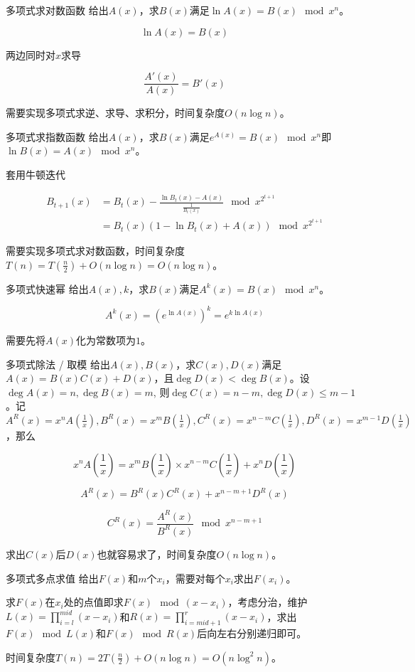 \documentclass{beamer}
\begin{document}
	\begin{frame}{多项式求对数函数}
		给出$A(x)$，求$B(x)$满足$\ln A(x)=B(x) \mod x^n$。
		
		$$\ln A(x)=B(x)$$
		
		两边同时对$x$求导
		
		$$\frac{A'(x)}{A(x)}=B'(x)$$
		
		需要实现多项式求逆、求导、求积分，时间复杂度$O(n\log n)$。
		
		
	\end{frame}
	\begin{frame}{多项式求指数函数}
		给出$A(x)$，求$B(x)$满足$e^{A(x)}=B(x) \mod x^n$即$\ln B(x) = A(x) \mod x^n$。 
		
		套用牛顿迭代
		
		$$\begin{aligned}B_{t+1}(x)&=B_t(x)-\frac{\ln B_t(x)-A(x)}{\frac{1}{B_t(x)}} \mod x^{2^{t+1}}\\&=B_t(x)(1-\ln B_t(x)+A(x))\mod x^{2^{t+1}}\end{aligned}$$ 
		
		需要实现多项式求对数函数，时间复杂度$T(n)=T(\frac n2)+O(n\log n)=O(n\log n)$。
	\end{frame}
	\begin{frame}{多项式快速幂}
		给出$A(x),k$，求$B(x)$满足$A^k(x)=B(x) \mod x^n$。
		
		$$A^k(x)=(e^{\ln A(x)})^k=e^{k\ln A(x)}$$
		
		需要先将$A(x)$化为常数项为$1$。
	\end{frame}
	\begin{frame}{多项式除法 / 取模}
		给出$A(x),B(x)$，求$C(x),D(x)$满足$A(x)=B(x)C(x)+D(x)$，且$\deg D(x) < \deg B(x)$。设$\deg A(x) = n, \deg B(x) = m$, 则$\deg C(x) = n-m, \deg D(x) \le m-1$。记$A^R(x)=x^nA(\frac 1x),B^R(x)=x^mB(\frac 1x),C^R(x)=x^{n-m}C(\frac 1x), D^R(x)=x^{m-1}D(\frac{1}{x})$，那么
		
		$$x^nA(\frac 1x)=x^mB(\frac 1x)\times x^{n-m}C(\frac 1x) + x^nD(\frac1x)$$
		
		$$A^R(x)=B^R(x)C^R(x)+x^{n-m+1}D^R(x)$$
		
		$$C^R(x)=\frac{A^R(x)}{B^R(x)} \mod x^{n-m+1}$$
		
		求出$C(x)$后$D(x)$也就容易求了，时间复杂度$O(n\log n)$。
	\end{frame}
	\begin{frame}{多项式多点求值}
		给出$F(x)$和$m$个$x_i$，需要对每个$x_i$求出$F(x_i)$。
		
		求$F(x)$在$x_i$处的点值即求$F(x) \mod (x-x_i)$，考虑分治，维护$L(x)=\prod\limits_{i=l}^{mid}(x-x_i)$和$R(x)=\prod\limits_{i=mid+1}^r(x-x_i)$，求出$F(x) \mod L(x)$和$F(x) \mod R(x)$后向左右分别递归即可。
		
		时间复杂度$T(n)=2T(\frac n2)+O(n\log n)=O(n\log^2n)$。
	\end{frame}
\end{document}
